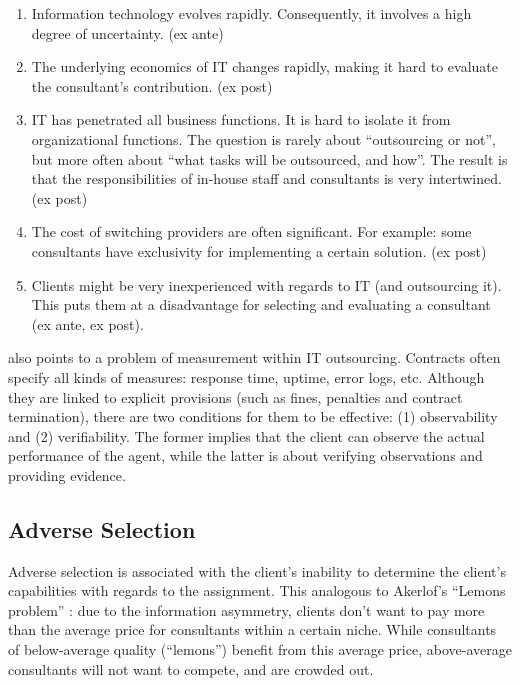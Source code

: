 \documentclass[12pt]{article}
\providecommand{\tightlist}{%
  \setlength{\itemsep}{0pt}\setlength{\parskip}{0pt}}
\begin{document}
\begin{enumerate}
\def\labelenumi{\arabic{enumi}.}
\tightlist
\item
  Information technology evolves rapidly. Consequently, it involves a
  high degree of uncertainty. (ex ante)
\item
  The underlying economics of IT changes rapidly, making it hard to
  evaluate the consultant's contribution. (ex post)
\item
  IT has penetrated all business functions. It is hard to isolate it
  from organizational functions. The question is rarely about
  ``outsourcing or not'', but more often about ``what tasks will be
  outsourced, and how''. The result is that the responsibilities of
  in-house staff and consultants is very intertwined. (ex post)
\item
  The cost of switching providers are often significant. For example:
  some consultants have exclusivity for implementing a certain solution.
  (ex post)
\item
  Clients might be very inexperienced with regards to IT (and
  outsourcing it). This puts them at a disadvantage for selecting and
  evaluating a consultant (ex ante, ex post).
\end{enumerate}

\citet[59]{aubert1996} also points to a problem of measurement within IT
outsourcing. Contracts often specify all kinds of measures: response
time, uptime, error logs, etc. Although they are linked to explicit
provisions (such as fines, penalties and contract termination), there
are two conditions for them to be effective: (1) observability and (2)
verifiability. The former implies that the client can observe the actual
performance of the agent, while the latter is about verifying
observations and providing evidence.

\hypertarget{adverse-selection}{%
\subsection{Adverse Selection}\label{adverse-selection}}

Adverse selection is associated with the client's inability to determine
the client's capabilities with regards to the assignment. This analogous
to Akerlof's ``Lemons problem'' \citeyearpar{akerlof1970}: due to the
information asymmetry, clients don't want to pay more than the average
price for consultants within a certain niche. While consultants of
below-average quality (``lemons'') benefit from this average price,
above-average consultants will not want to compete, and are crowded out.
\end{document}
